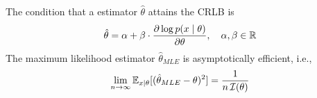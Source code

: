 The condition that a estimator $\hat{\theta}$ attains the CRLB is
\begin{equation}
	\hat{\theta} = \alpha + \beta\cdot  \frac{\partial\log p(x \mid \theta)}{\partial \theta}, \quad \alpha, \beta \in \mathbb{R}
\end{equation}
The maximum likelihood estimator $\hat{\theta}_{MLE}$ is asymptotically efficient, i.e.,
\begin{equation}
	\lim_{n\rightarrow \infty} \mathbb{E}_{x\mid \theta}[(\hat{\theta}_{MLE}-\theta)^2] = \frac{1}{n\, \mathcal{I}(\theta)}
\end{equation}
%
